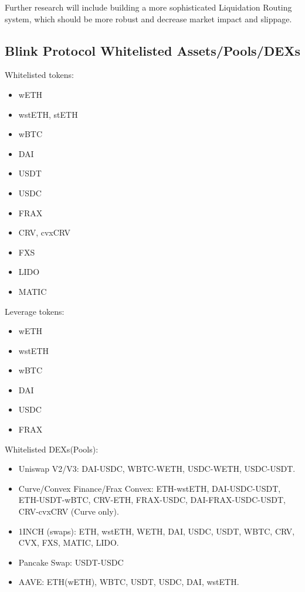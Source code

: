 \documentclass[conference]{IEEEtran}
\begin{document}
Further research will include building a more sophisticated Liquidation Routing system, which should be more robust and decrease market impact and slippage.






\newpage

\begin{appendices}
\section{Blink Protocol Whitelisted Assets/Pools/DEXs}
Whitelisted tokens:
\begin{itemize}
	\item wETH
	\item wstETH, stETH
	\item wBTC
	\item DAI
	\item USDT
	\item USDC
	\item FRAX
	\item CRV, cvxCRV
	\item FXS
	\item LIDO
	\item MATIC
\end{itemize}
Leverage tokens: 
\begin{itemize}
	\item wETH
	\item wstETH
	\item wBTC
	\item DAI
	\item USDC
	\item FRAX
\end{itemize}
Whitelisted DEXs(Pools):
\begin{itemize}
	\item Uniswap V2/V3: DAI-USDC, WBTC-WETH, USDC-WETH, USDC-USDT.
	\item Curve/Convex Finance/Frax Convex: ETH-wstETH, DAI-USDC-USDT, ETH-USDT-wBTC, CRV-ETH, FRAX-USDC, DAI-FRAX-USDC-USDT, CRV-cvxCRV (Curve only).
	\item 1INCH (swaps): ETH, wstETH, WETH, DAI, USDC, USDT, WBTC, CRV, CVX, FXS, MATIC, LIDO.
	\item Pancake Swap: USDT-USDC
	\item AAVE: ETH(wETH), WBTC, USDT, USDC, DAI, wstETH.
\end{itemize}




\end{appendices}
\end{document}
